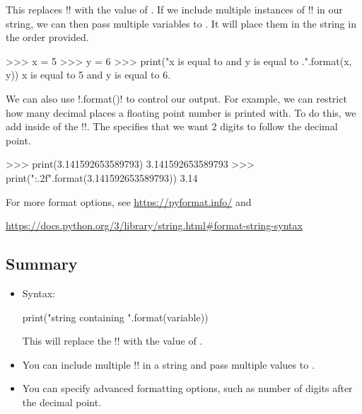 \documentclass[11pt]{cselabheader}
\begin{document}
This
replaces \pythoninline!{}! with the value of .
If we include multiple instances of \pythoninline!{}! in our string, we can then
pass multiple variables to . It will place them in the
string in the order provided.

\begin{pyconcode}
>>> x = 5
>>> y = 6
>>> print("x is equal to {} and y is equal to {}.".format(x, y))
x is equal to 5 and y is equal to 6.
\end{pyconcode}

We can also use \pythoninline!.format()! to control our output. For example, we
can restrict how many decimal places a floating point number is printed with. To
do this, we add  inside of the \pythoninline!{}!. The
 specifies that we want 2 digits to follow the decimal point.

\begin{pyconcode}
>>> print(3.141592653589793)
3.141592653589793
>>> print("{:.2f}".format(3.141592653589793))
3.14
\end{pyconcode}

For more format options, see \url{https://pyformat.info/} and
\begin{center}
  \vspace{-2mm}
  \url{https://docs.python.org/3/library/string.html#format-string-syntax}
  \vspace{-2mm}
\end{center}

\subsection{Summary}

\begin{itemize}
  \item Syntax:
    \begin{python3code}
print("string containing {}".format(variable))
    \end{python3code}

    This will replace the \pythoninline!{}! with the value of
    .

  \item You can include multiple \pythoninline!{}! in a string and pass multiple
    values to .

  \item You can specify advanced formatting options, such as number of digits
    after the decimal point.
\end{itemize}
\end{document}
